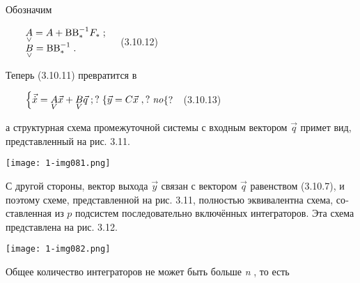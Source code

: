 \documentclass[a4paper]{article}
\newcommand\normalsubformula[1]{\text{\mathversion{normal}$#1$}}
\begin{document}
{\begin{russian}\sffamily
Обозначим
\end{russian}}

{\begin{russian}\sffamily
\ \ \ \  $\begin{matrix}\underset{\vee }{A}=A+\normalsubformula{\text{BB}}_{\ast }^{-1}F_{\ast }\;;\hfill\null
\\\underset{\vee }{B}=\normalsubformula{\text{BB}}_{\ast }^{-1}\;.\hfill\null \end{matrix}\hfill $ \ \ (3.10.12)
\end{russian}}

{\begin{russian}\sffamily
Теперь (3.10.11) превратится в 
\end{russian}}

{\begin{russian}\sffamily
\ \ \ \  $\begin{matrix}\left\{\vec{\dot x}=\underset V{A}\vec x+\underset V{B}\vec q\;;?\right.\left\{\vec y=C\vec
x\;,?\right.\mathit{no}\hfill\null \end{matrix}\{?$\ \ (3.10.13)
\end{russian}}

{\begin{russian}\sffamily
а структурная схема промежуточной системы с входным вектором  $\vec q$ примет вид, представленный на рис. 3.11.
\end{russian}}


\bigskip

{\centering  \texttt{[image: 1-img081.png]} \par}

\bigskip

{\begin{russian}\sffamily
С другой стороны, вектор выхода  $\vec y$ связан с вектором  $\vec q$ равенством (3.10.7), и поэтому схеме,
представленной на рис. 3.11, полностью эквивалентна схема, составленная из  $p$ подсистем последовательно включённых
интеграторов. Эта схема представлена на рис. 3.12.
\end{russian}}


\bigskip

{\centering  \texttt{[image: 1-img082.png]} \par}

\bigskip

{\begin{russian}\sffamily
Общее количество интеграторов не может быть больше \textit{n }, то есть
\end{russian}}
\end{document}
